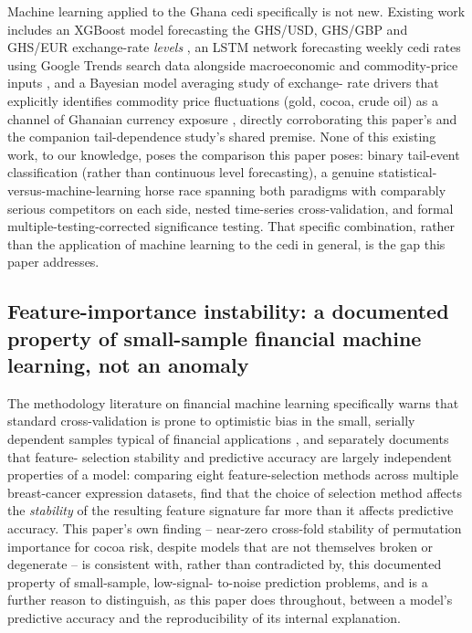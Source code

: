 \documentclass[final,3p,times,authoryear]{elsarticle}
\begin{document}
Machine learning applied to the Ghana cedi specifically is not new.
Existing work includes an XGBoost model forecasting the GHS/USD,
GHS/GBP and GHS/EUR exchange-rate \emph{levels} \citep{ghanaxgboost2025},
an LSTM network forecasting weekly cedi rates using Google Trends search
data alongside macroeconomic and commodity-price inputs
\citep{ghanalstm2021}, and a Bayesian model averaging study of exchange-
rate drivers that explicitly identifies commodity price fluctuations
(gold, cocoa, crude oil) as a channel of Ghanaian currency exposure
\citep{ghanabma2024}, directly corroborating this paper's and the
companion tail-dependence study's shared premise. None of this existing
work, to our knowledge, poses the comparison this paper poses: binary
tail-event classification (rather than continuous level forecasting),
a genuine statistical-versus-machine-learning horse race spanning both
paradigms with comparably serious competitors on each side, nested
time-series cross-validation, and formal multiple-testing-corrected
significance testing. That specific combination, rather than the
application of machine learning to the cedi in general, is the gap this
paper addresses.

\subsection{Feature-importance instability: a documented property of
small-sample financial machine learning, not an anomaly}

The methodology literature on financial machine learning specifically
warns that standard cross-validation is prone to optimistic bias in the
small, serially dependent samples typical of financial applications
\citep{deprado2018,vabalas2019}, and separately documents that feature-
selection stability and predictive accuracy are largely independent
properties of a model: comparing eight feature-selection methods across
multiple breast-cancer expression datasets, \citet{haury2011} find that
the choice of selection method affects the \emph{stability} of the
resulting feature signature far more than it affects predictive
accuracy. This paper's own finding -- near-zero cross-fold stability of
permutation importance for cocoa risk, despite models that are not
themselves broken or degenerate -- is consistent with, rather than
contradicted by, this documented property of small-sample, low-signal-
to-noise prediction problems, and is a further reason to distinguish, as
this paper does throughout, between a model's predictive accuracy and
the reproducibility of its internal explanation.
\end{document}
